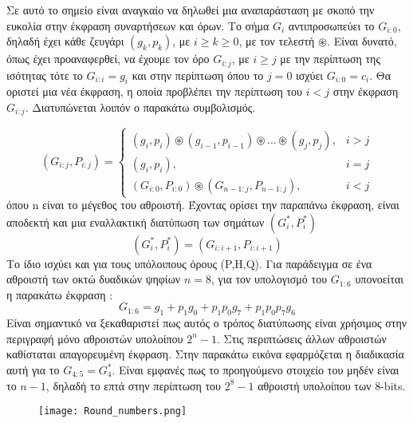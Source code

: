 Σε αυτό το σημείο είναι αναγκαίο να δηλωθεί μια αναπαράσταση με σκοπό την ευκολία στην
έκφραση συναρτήσεων και όρων. Το σήμα $G_{i}$ αντιπροσωπεύει το $G_{i:0}$, δηλαδή
έχει κάθε ζευγάρι $(g_k,p_k)$, με $ i \geq k \geq 0 $, με τον τελεστή $\circledast$.
Είναι δυνατό, όπως έχει προαναφερθεί, να έχουμε τον όρο $G_{i:j}$, με $ i \geq j$ με
την περίπτωση της ισότητας τότε το $G_{i:i} = g_i$ και στην περίπτωση όπου το $j=0$ ισχύει $G_{i:0}=c_i$. Θα οριστεί μια νέα έκφραση, η οποία 
προβλέπει την περίπτωση του $i < j$ στην έκφραση $G_{i:j}$. Διατυπώνεται λοιπόν ο παρακάτω συμβολισμός.

\begin{equation}
    (G_{i:j},P_{i:j}) =
    \begin{cases}
        (g_i,p_i)\circledast(g_{i-1},p_{i-1})\circledast...\circledast(g_j,p_j) ,& i > j \\
        (g_i,p_i) ,& i = j \\
        (G_{i:0},P_{i:0}) \circledast (G_{n-1:j},P_{n-1:j}) ,& i < j
    \end{cases}
\end{equation}
όπου n είναι το μέγεθος του αθροιστή. Έχοντας ορίσει την παραπάνω έκφραση, είναι αποδεκτή και μια εναλλακτική διατύπωση των σημάτων $(G^*_i,P^*_i)$
\begin{equation}
    (G^*_i,P^*_i) = (G_{i:i+1},P_{i:i+1})
\end{equation}
Το ίδιο ισχύει και για τους υπόλοιπους όρους (P,H,Q).
Για παράδειγμα σε ένα αθροιστή των οκτώ δυαδικών ψηφίων $n=8$, για τον υπολογισμό του 
$G_{1:6}$ υπονοείται η παρακάτω έκφραση :
\begin{equation*}
    G_{1:6} = g_1 + p_1g_0 + p_1p_0g_7 + p_1p_0p_7g_6
\end{equation*}
Είναι σημαντικό να ξεκαθαριστεί πως αυτός ο τρόπος διατύπωσης είναι χρήσιμος στην περιγραφή μόνο αθροιστών υπολοίπου $2^n-1$. Στις περιπτώσεις άλλων αθροιστών καθίσταται απαγορευμένη έκφραση. Στην παρακάτω εικόνα εφαρμόζεται η διαδικασία αυτή για το $G_{4:5} = G^*_{4}$. Είναι εμφανές πως το προηγούμενο στοιχείο του μηδέν είναι το $n-1$, δηλαδή το επτά στην περίπτωση του $2^8-1$ αθροιστή υπολοίπου των 8-bits. 
\begin{figure}[H]
    \centering
    \texttt{[image: Round\_numbers.png]}
\end{figure}


